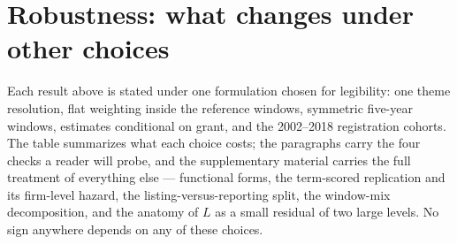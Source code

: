 \section{Robustness: what changes under other choices}\label{sec:robust}

Each result above is stated under one formulation chosen for legibility:
one theme resolution, flat weighting inside the reference windows,
symmetric five-year windows, estimates conditional on grant, and the
2002--2018 registration cohorts. The table summarizes what each choice
costs; the paragraphs carry the four checks a reader will probe, and the
supplementary material carries the full treatment of everything else ---
functional forms, the term-scored replication and its firm-level hazard,
the listing-versus-reporting split, the window-mix decomposition, and the
anatomy of $L$ as a small residual of two large levels. No sign anywhere
depends on any of these choices.


